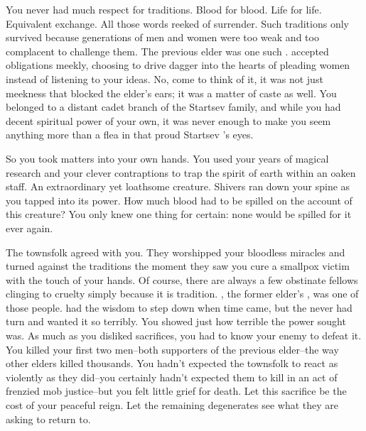 \documentclass[char]{Pestilence}
\begin{document}
\name{\cElder{}}

You never had much respect for traditions. Blood for blood. Life for life. Equivalent exchange. All those words reeked of surrender. Such traditions only survived because generations of men and women were too weak and too complacent to challenge them. The previous elder was one such \cShaman{\human}. \cShaman{\They} accepted \cShaman{\their} obligations meekly, choosing to drive \cShaman{\their} dagger into the hearts of pleading women instead of listening to your ideas. No, come to think of it, it was not just meekness that blocked the elder's ears; it was a matter of caste as well. You belonged to a distant cadet branch of the Startsev family, and while you had decent spiritual power of your own, it was never enough to make you seem anything more than a flea in that proud Startsev \cShaman{\human}'s eyes. 

So you took matters into your own hands. You used your years of magical research and your clever contraptions to trap the spirit of earth within an oaken staff. An extraordinary yet loathsome creature. Shivers ran down your spine as you tapped into its power. How much blood had to be spilled on the account of this creature? You only knew one thing for certain: none would be spilled for it ever again.

The townsfolk agreed with you. They worshipped your bloodless miracles and turned against the traditions the moment they saw you cure a smallpox victim with the touch of your hands. Of course, there are always a few obstinate fellows clinging to cruelty simply because it is tradition. \cPlaguebearer{}, the former elder's \cPlaguebearer{\offspring}, was one of those people. \cPlaguebearer{\Their} \cShaman{\parent} had the wisdom to step down when time came, but the \cPlaguebearer{\kid} never had \cPlaguebearer{\their} turn and \cPlaguebearer{\they} wanted it so terribly. You showed \cPlaguebearer{\them} just how terrible the power \cPlaguebearer{\they} sought was. As much as you disliked sacrifices, you had to know your enemy to defeat it. You killed your first two men--both supporters of the previous elder--the way other elders killed thousands. You hadn't expected the townsfolk to react as violently as they did--you certainly hadn't expected them to kill \cPlaguebearer{} in an act of frenzied mob justice--but you felt little grief for \cPlaguebearer{\their} death. Let this sacrifice be the cost of your peaceful reign. Let the remaining degenerates see what they are asking to return to.
\end{document}
